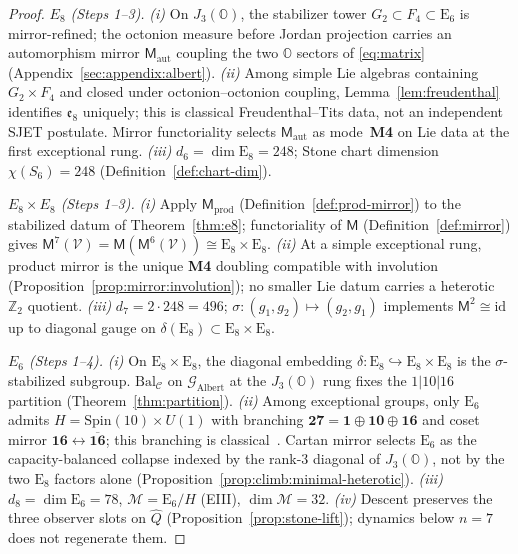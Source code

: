 \documentclass[11pt]{article}
\theoremstyle{plain}
\theoremstyle{definition}
\theoremstyle{remark}
\numberwithin{equation}{section}
\newcommand{\Oct}{\mathbb{O}}
\newcommand{\jalg}{J_3(\mathbb{O})}
\newcommand{\E}[1]{\mathrm{E}_{#1}}
\newcommand{\Spin}{\mathrm{Spin}}
\newcommand{\Void}{\mathcal{V}}
\newcommand{\Mirror}{\mathsf{M}}
\begin{document}
\begin{proof}
\emph{$E_8$ (Steps 1--3).}
\emph{(i)} On $\jalg$, the stabilizer tower $G_2\subset F_4\subset\E{6}$ is
mirror-refined; the octonion measure before Jordan projection carries an
automorphism mirror $\Mirror_{\mathrm{aut}}$ coupling the two $\Oct$ sectors of
\eqref{eq:matrix} (Appendix~\ref{sec:appendix:albert}).
\emph{(ii)} Among simple Lie algebras containing $G_2\times F_4$ and closed
under octonion--octonion coupling, Lemma~\ref{lem:freudenthal} identifies
$\mathfrak{e}_8$ uniquely; this is classical Freudenthal--Tits data, not an
independent SJET postulate. Mirror functoriality selects
$\Mirror_{\mathrm{aut}}$ as mode~\textbf{M4} on Lie data at the first
exceptional rung.
\emph{(iii)} $d_6=\dim\E{8}=248$; Stone chart dimension $\chi(S_6)=248$
(Definition~\ref{def:chart-dim}).

\emph{$E_8\times E_8$ (Steps 1--3).}
\emph{(i)} Apply $\Mirror_{\mathrm{prod}}$ (Definition~\ref{def:prod-mirror})
to the stabilized datum of Theorem~\ref{thm:e8}; functoriality of $\Mirror$
(Definition~\ref{def:mirror}) gives
$\Mirror^7(\Void)=\Mirror(\Mirror^6(\Void))\cong\E{8}\times\E{8}$.
\emph{(ii)} At a simple exceptional rung, product mirror is the unique
\textbf{M4} doubling compatible with involution
(Proposition~\ref{prop:mirror:involution}); no smaller Lie datum carries a
heterotic $\mathbb{Z}_2$ quotient.
\emph{(iii)} $d_7=2\cdot248=496$; $\sigma:(g_1,g_2)\mapsto(g_2,g_1)$
implements $\Mirror^2\cong\mathrm{id}$ up to diagonal gauge on
$\delta(\E{8})\subset\E{8}\times\E{8}$.

\emph{$E_6$ (Steps 1--4).}
\emph{(i)} On $\E{8}\times\E{8}$, the diagonal embedding
$\delta:\E{8}\hookrightarrow\E{8}\times\E{8}$ is the $\sigma$-stabilized
subgroup. $\mathrm{Bal}_{\mathcal{C}}$ on $\mathcal{G}_{\mathrm{Albert}}$ at
the $\jalg$ rung fixes the $1|10|16$ partition
(Theorem~\ref{thm:partition}).
\emph{(ii)} Among exceptional groups, only $\E{6}$ admits
$H=\Spin(10)\times U(1)$ with branching
$\mathbf{27}=\mathbf{1}\oplus\mathbf{10}\oplus\mathbf{16}$ and coset mirror
$\mathbf{16}\leftrightarrow\overline{\mathbf{16}}$; this branching is
classical~\cite{SpringerVeldkamp2000}. Cartan mirror selects $\E{6}$ as the
capacity-balanced collapse indexed by the rank-$3$ diagonal of $\jalg$, not by
the two $\E{8}$ factors alone (Proposition~\ref{prop:climb:minimal-heterotic}).
\emph{(iii)} $d_8=\dim\E{6}=78$, $\mathcal{M}=\E{6}/H$ (EIII),
$\dim\mathcal{M}=32$.
\emph{(iv)} Descent preserves the three observer slots on $\hat Q$
(Proposition~\ref{prop:stone-lift}); dynamics below $n=7$ does not regenerate
them.
\end{proof}
\end{document}
